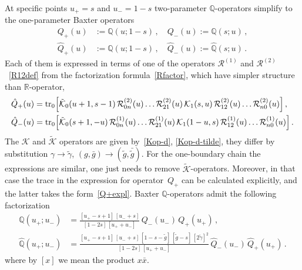 \documentclass[a4paper,11pt]{article}
\newcommand{\tr}{\mathop{\rm tr}\nolimits}
\numberwithin{equation}{section}
\begin{document}
At specific points $u_+ = s$ and $u_- = 1-s$ two-parameter $\mathbb{Q}$-operators simplify to the one-parameter Baxter operators
\begin{align*}
	Q_+(u) &:= \mathbb{Q}(u;1-s) \,, \quad Q_-(u) := \mathbb{Q}(s;u) \,, \\
	\hat{Q}_+(u) &:= \hat{\mathbb{Q}}(u;1-s) \,, \quad \hat{Q}_-(u) := \hat{\mathbb{Q}}(s;u) \,.
\end{align*}
Each of them is expressed in terms of one of the operators $\mathcal{R}^{(1)}$ and $\mathcal{R}^{(2)}$~\eqref{R12def} from the factorization formula~\eqref{Rfactor}, which have simpler structure than $\mathbb{R}$-operator,
\begin{align}
	& \nonumber
	\hat{Q}_+(u)= \tr_{0}\Bigl[\tilde{\mathcal{K}}_0(u+1, s-1)\,\mathcal{R}^{(2)}_{0n}(u)\ldots\mathcal{R}^{(2)}_{21}(u)\,\mathcal{K}_1(s,u)\,\mathcal{R}^{(2)}_{12}(u)\ldots\mathcal{R}^{(2)}_{n0}(u)\Bigr]\,, \\
	& \nonumber
	\hat{Q}_-(u)= \tr_{0}\Bigl[\tilde{\mathcal{K}}_0(s+1, -u)\,\mathcal{R}^{(1)}_{0n}(u)\ldots\mathcal{R}^{(1)}_{21}(u)\,\mathcal{K}_1(1-u,s)\,\mathcal{R}^{(1)}_{12}(u)\ldots\mathcal{R}^{(1)}_{n0}(u)\Bigr] \,.
\end{align}
The $\mathcal{K}$ and $\tilde{\mathcal{K}}$ operators are given by~\eqref{Kop-d}, \eqref{Kop-d-tilde}, they differ by substitution $\gamma\to\tilde{\gamma}$, $(g,\bar{g})\to (\tilde{g},\bar{\tilde{g}})$.
For the one-boundary chain the expressions are similar, one just needs to remove $\tilde{\mathcal{K}}$-operators.
Moreover, in that case the trace in the expression for operator~$Q_+$ can be calculated explicitly, and the latter takes the form~\eqref{Q+expl}.
Baxter $\mathbb{Q}$-operators admit the following factorization
\begin{equation*}
	\begin{aligned}
		\mathbb{Q}(u_+;u_-) &= \frac{[u_+-s+1]\,[u_-+s]}{[1-2s]\,[u_++u_-]}\,Q_-(u_-)\,Q_+(u_+) \,, \\
		\hat{\mathbb{Q}}(u_+;u_-) &= \frac{[u_+-s+1]\,[u_-+s]\,[1-s-\tilde{g}]\,[\tilde{g}-s]\,[2\tilde{\gamma}]^2}{[1-2s]\,[u_++u_-]}\,\hat{Q}_-(u_-)\,\hat{Q}_+(u_+) \,.
	\end{aligned}
\end{equation*}     
where by $[x]$ we mean the product $x\bar{x}$.
\end{document}
